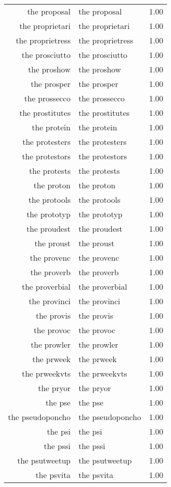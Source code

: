\begin{table}[ht]
\begin{tabular}{rlr}
  the proposal & the proposal & 1.00 \\ 
  the proprietari & the proprietari & 1.00 \\ 
  the proprietress & the proprietress & 1.00 \\ 
  the prosciutto & the prosciutto & 1.00 \\ 
  the proshow & the proshow & 1.00 \\ 
  the prosper & the prosper & 1.00 \\ 
  the prossecco & the prossecco & 1.00 \\ 
  the prostitutes & the prostitutes & 1.00 \\ 
  the protein & the protein & 1.00 \\ 
  the protesters & the protesters & 1.00 \\ 
  the protestors & the protestors & 1.00 \\ 
  the protests & the protests & 1.00 \\ 
  the proton & the proton & 1.00 \\ 
  the protools & the protools & 1.00 \\ 
  the prototyp & the prototyp & 1.00 \\ 
  the proudest & the proudest & 1.00 \\ 
  the proust & the proust & 1.00 \\ 
  the provenc & the provenc & 1.00 \\ 
  the proverb & the proverb & 1.00 \\ 
  the proverbial & the proverbial & 1.00 \\ 
  the provinci & the provinci & 1.00 \\ 
  the provis & the provis & 1.00 \\ 
  the provoc & the provoc & 1.00 \\ 
  the prowler & the prowler & 1.00 \\ 
  the prweek & the prweek & 1.00 \\ 
  the prweekvts & the prweekvts & 1.00 \\ 
  the pryor & the pryor & 1.00 \\ 
  the pse & the pse & 1.00 \\ 
  the pseudoponcho & the pseudoponcho & 1.00 \\ 
  the psi & the psi & 1.00 \\ 
  the pssi & the pssi & 1.00 \\ 
  the psutweetup & the psutweetup & 1.00 \\ 
  the psvita & the psvita & 1.00 \\ 

\end{tabular}
\end{table}
